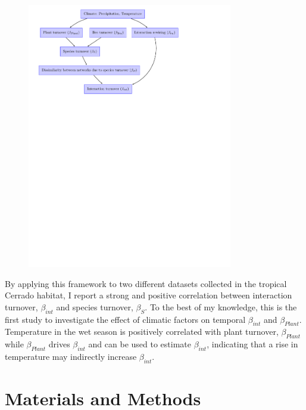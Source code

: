 \documentclass[11pt]{article}
\begin{document}
\begin{figure}[h]
  \centering
    \includegraphics[width=0.8\textwidth]{flowchart.pdf} \\

    \label{fig: flowchart}
\end{figure}

By applying this framework to two different datasets collected in the tropical Cerrado habitat, I report a strong and positive correlation between interaction turnover, $\beta_{int}$ and species turnover, $\beta_{S}$. To the best of my knowledge, this is the first study to investigate the effect of climatic factors on temporal $\beta_{int}$ and $\beta_{Plant}$. Temperature in the wet season is positively correlated with plant turnover, $\beta_{Plant}$ while $\beta_{Plant}$ drives $\beta_{int}$ and can be used to estimate $\beta_{int}$, indicating that a rise in temperature may indirectly increase $\beta_{int}$. 

\newpage
\section{Materials and Methods} %
\end{document}
